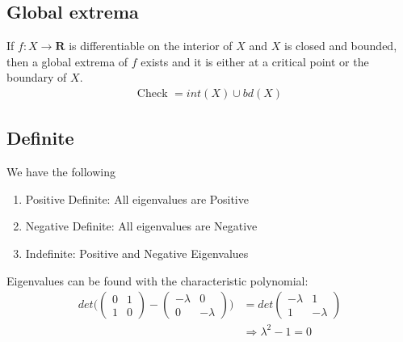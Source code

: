 \documentclass[8pt]{extarticle}
\newcommand{\R}{{\mathbb R}}
\newcommand{\X}{{\mathcal X}}
\newcommand{\ra}{{\rightarrow}}
\newcommand{\Ra}{{\Rightarrow}}
\def\R{\mathbf{R}}
\def\X{X}
\begin{document}
\begin{multicols*}{3}
  \subsection{Global extrema}
  If $f: \X \ra \R$ is differentiable on the interior
  of $\X$ and $\X$ is closed and bounded, then a global
  extrema of $f$ exists and it is either at a critical point
  or the boundary of $\X$.
  \begin{align*}
    \text{Check } = int(\X) \cup bd(\X)
  \end{align*}
  \subsection{Definite}
  We have the following
  \begin{enumerate}[label=(\arabic*)]
    \item Positive Definite: All eigenvalues are Positive
    \item Negative Definite: All eigenvalues are Negative
    \item Indefinite: Positive and Negative Eigenvalues
  \end{enumerate}
  Eigenvalues can be found with the characteristic polynomial:
  \begin{align*}
    det \Bigg(
    \begin{pmatrix}
      0 & 1 \\
      1 & 0
    \end{pmatrix}
    -
    \begin{pmatrix}
      -\lambda & 0         \\
      0        & - \lambda
    \end{pmatrix}
    \Bigg)
     & =
    det
    \begin{pmatrix}
      - \lambda & 1         \\
      1         & - \lambda
    \end{pmatrix} \\
     & \Ra \lambda^2 - 1 = 0   \\
  \end{align*}

\end{multicols*}
\end{document}

